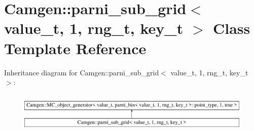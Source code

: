 \hypertarget{a00391}{\section{Camgen\-:\-:parni\-\_\-sub\-\_\-grid$<$ value\-\_\-t, 1, rng\-\_\-t, key\-\_\-t $>$ Class Template Reference}
\label{a00391}
}
Inheritance diagram for Camgen\-:\-:parni\-\_\-sub\-\_\-grid$<$ value\-\_\-t, 1, rng\-\_\-t, key\-\_\-t $>$\-:\begin{figure}[H]
\begin{center}
\leavevmode
\includegraphics[height=1.895093cm]{a00391}
\end{center}
\end{figure}
